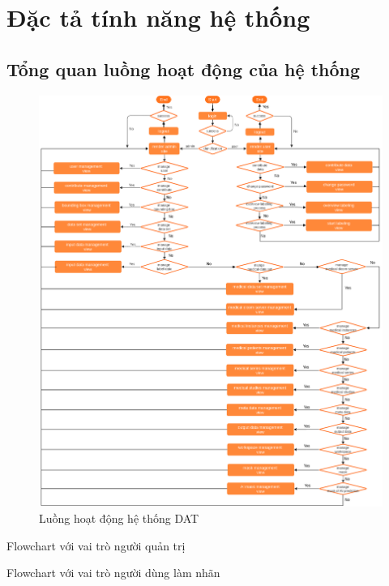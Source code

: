 \section{Đặc tả tính năng hệ thống}
\newpage
\subsection{Tổng quan luồng hoạt động của hệ thống}
\begin{figure}[H]
    \centering
    \includegraphics[width=16cm]{images/chapter-07-images/flow-chart-no-05.png}
    \caption{Luồng hoạt động hệ thống DAT}
\end{figure}


Flowchart với vai trò người quản trị

Flowchart với vai trò người dùng làm nhãn

